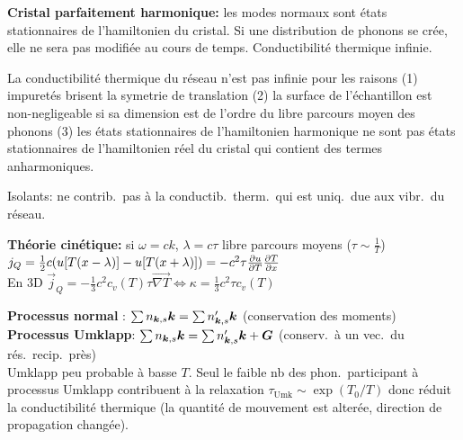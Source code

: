 \begin{squishlist}
    \item \textbf{Cristal parfaitement harmonique:} les modes normaux sont états stationnaires de l'hamiltonien du cristal. Si une distribution de phonons se crée, elle ne sera pas modifiée au cours de temps. Conductibilité thermique infinie.
    \item La conductibilité thermique du réseau n'est pas infinie pour les raisons
    (1) impuretés brisent la symetrie de translation (2) la surface de l'échantillon est non-negligeable si sa dimension est de l'ordre du libre parcours moyen des phonons (3) les états stationnaires de l’hamiltonien harmonique ne sont pas états stationnaires de l’hamiltonien réel du cristal qui contient des termes anharmoniques.
    \item Isolants: \elec ne contrib.\ pas à la conductib.\ therm.\ qui est uniq.\ due aux vibr.\ du réseau.
    \item \textbf{Théorie cinétique:} si $\omega = ck$, $\lambda = c \tau$ libre parcours moyens ($\tau \sim \frac{1}{T}$) \\ $j_Q = \frac{1}{2}c (u[T(x-\lambda)] - u[T(x+\lambda)]) = - c^2 \tau \D{T}{u}\D{x}{T}$ \\
    En 3D $\vec{j}_Q = - \frac{1}{3}c^2 c_v(T) \tau \vec{\nabla T} \Longleftrightarrow \kappa = \frac{1}{3} c^2 \tau c_v(T)$
    \item \textbf{Processus normal} : $\sum n_{\vk,s}\vk = \sum n'_{\vk, s}\vk$ (conservation des moments) \\
    \textbf{Processus Umklapp}:  $\sum n_{\vk,s}\vk = \sum n'_{\vk, s}\vk + \vG$ (conserv.\ à un vec.\ du rés.\ recip.\ près) \\
    Umklapp peu probable à basse $T$. Seul le faible nb des phon.\ participant à  processus Umklapp contribuent à la relaxation $\tau_{\text{Umk}} \sim \exp(T_0/T)$ donc réduit la conductibilité thermique (la quantité de mouvement est alterée, direction de propagation changée).
\end{squishlist}


